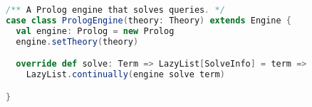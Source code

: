 \begin{lstlisting}[label=code:prolog-engine, language=Scala, caption=Motore TuProlog]
/** A Prolog engine that solves queries. */
case class PrologEngine(theory: Theory) extends Engine {
  val engine: Prolog = new Prolog
  engine.setTheory(theory)

  override def solve: Term => LazyList[SolveInfo] = term =>
    LazyList.continually(engine solve term)

}
\end{lstlisting}